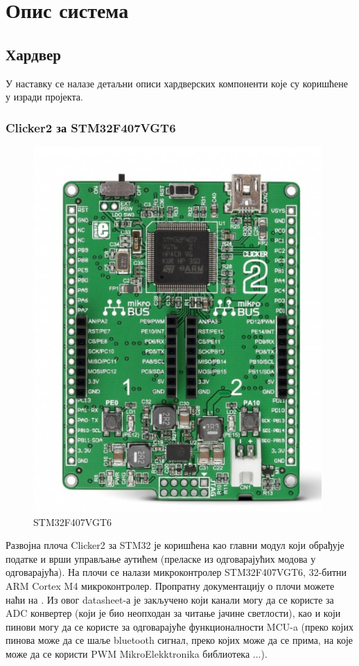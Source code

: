 \chapter{Опис система}
\section{Хардвер}
У наставку се налазе детаљни описи хардверских компоненти које су коришћене у изради пројекта. 
\subsection{Clicker2 за STM32F407VGT6}
\begin{figure}[htb!]
\begin{center}
\includegraphics[scale=1]{pictures/STM32}
\caption{STM32F407VGT6}\label{fig:STM32}
\end{center}
\end{figure}
Развојна плоча Clicker2 за STM32 је коришћена као главни модул који обрађује податке и врши управљање аутићем (преласке из одговарајућих модова у одговарајућа). На плочи се налази микроконтролер  STM32F407VGT6, 32-битни ARM Cortex M4 микроконтролер. Пропратну документацију о плочи можете наћи на \cite{STM32ST}. Из овог datasheet-а је закључено који канали могу да се користе за ADC конвертер (који је био неопходан за читање јачине светлости), као и који пинови могу да се користе за одговарајуће функционалности MCU-a (преко којих пинова може да се шаље bluetooth сигнал, преко којих може да се прима, на које може да се користи PWM MikroElekktronika библиотека ...).


